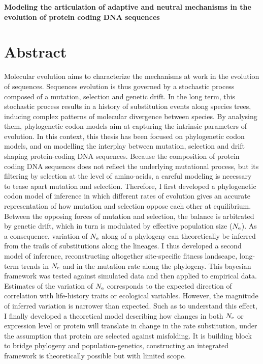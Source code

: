 \begin{center}
	\LARGE
	\textbf{Modeling the articulation of adaptive and neutral mechanisms in the evolution of protein coding DNA sequences}
\end{center}

\section*{Abstract}

Molecular evolution aims to characterize the mechanisms at work in the evolution of sequences.
Sequences evolution is thus governed by a stochastic process composed of a mutation, selection and genetic drift.
In the long term, this stochastic process results in a history of substitution events along species trees, inducing complex patterns of molecular divergence between species.
By analysing them, phylogenetic codon models aim at capturing the intrinsic parameters of evolution.
In this context, this thesis has been focused on phylogenetic codon models, and on modelling the interplay between mutation, selection and drift shaping protein-coding DNA sequences.
Because the composition of protein coding DNA sequences does not reflect the underlying mutational process, but its filtering by selection at the level of amino-acids, a careful modeling is necessary to tease apart mutation and selection.
Therefore, I first developed a phylogenetic codon model of inference in which different rates of evolution gives an accurate representation of how mutation and selection oppose each other at equilibrium.
Between the opposing forces of mutation and selection, the balance is arbitrated by genetic drift, which in turn is modulated by effective population size ($N_{\textrm{e}}$).
As a consequence, variation of $N_{\textrm{e}}$ along of a phylogeny can theoretically be inferred from the trails of substitutions along the lineages.
I thus developed a second model of inference, reconstructing altogether site-specific fitness landscape, long-term trends in $N_{\textrm{e}}$ and in the mutation rate along the phylogeny.
This bayesian framework was tested against simulated data and then applied to empirical data.
Estimates of the variation of $N_{\textrm{e}}$ corresponds to the expected direction of correlation with life-history traits or ecological variables.
However, the magnitude of inferred variation is narrower than expected.
Such as to understand this effect, I finally developed a theoretical model describing how changes in both $N_{\textrm{e}}$ or expression level or protein will translate in change in the rate substitution, under the assumption that protein are selected against misfolding.
It is building block to bridge phylogeny and population-genetics, constructing an integrated framework is theoretically possible but with limited scope.
